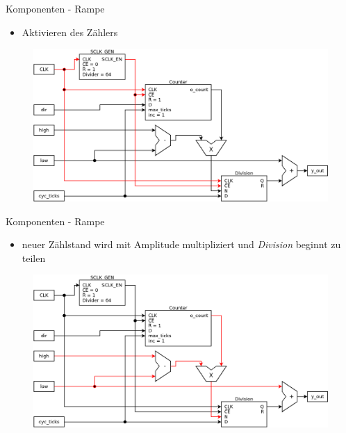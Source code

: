 \documentclass[11pt]{beamer}
\begin{document}
\begin{frame}{Komponenten - Rampe}
  \begin{itemize}
    \item Aktivieren des Zählers
  \end{itemize}
  \begin{figure}
    \includegraphics[scale=0.28]{ramp_step1}
  \end{figure}
\end{frame}

\begin{frame}{Komponenten - Rampe}
  \begin{itemize}
    \item neuer Zählstand wird mit Amplitude multipliziert und \emph{Division} beginnt zu teilen
  \end{itemize}
  \begin{figure}
    \includegraphics[scale=0.28]{ramp_step2}
  \end{figure}
\end{frame}
\end{document}
